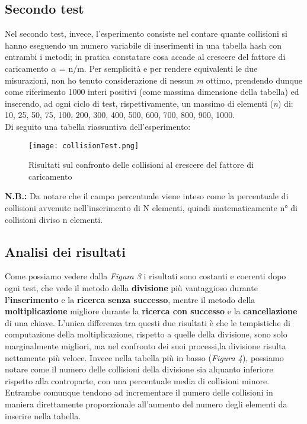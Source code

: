 \documentclass{article}
\begin{document}
\subsection{Secondo test}
Nel secondo test, invece, l'esperimento consiste nel contare quante collisioni si hanno eseguendo un numero variabile di inserimenti in una tabella hash con entrambi i metodi; in pratica constatare cosa accade al crescere del fattore di caricamento $\alpha$ = n/m.
Per semplicità e per rendere equivalenti le due misurazioni, non ho tenuto considerazione di nessun \textit{m} ottimo, prendendo dunque come riferimento 1000 interi positivi (come massima dimensione della tabella) ed inserendo, ad ogni ciclo di test, rispettivamente, un massimo di elementi (\textit{n}) di: 10, 25, 50, 75, 100, 200, 300, 400, 500, 600, 700, 800, 900, 1000.\\
Di seguito una tabella riassuntiva dell'esperimento:
\begin{figure}[!ht]
        \centering
        \texttt{[image: collisionTest.png]}
        \caption{Risultati sul confronto delle collisioni al crescere del fattore di caricamento}
        \label{fig:collisionTest}
\end{figure}

\textbf{N.B.:} Da notare che il campo percentuale viene inteso come la percentuale di collisioni avvenute nell'inserimento di N elementi, quindi matematicamente n° di collisioni diviso n elementi.

\clearpage

\subsection{Analisi dei risultati}
Come possiamo vedere dalla \textit{Figura 3} i risultati sono costanti e coerenti dopo ogni test, che vede il metodo della \textbf{divisione} più vantaggioso durante \textbf{l'inserimento} e la \textbf{ricerca senza successo}, mentre il metodo della \textbf{moltiplicazione} migliore durante la \textbf{ricerca con successo} e la \textbf{cancellazione} di una chiave. L'unica differenza tra questi due risultati è che le tempistiche di computazione della moltiplicazione, rispetto a quelle della divisione, sono solo marginalmente migliori, ma nel confronto dei suoi processi,la divisione risulta nettamente più veloce.
Invece nella tabella più in basso (\textit{Figura 4}), possiamo notare come il numero delle collisioni della divisione sia alquanto inferiore rispetto alla controparte, con una percentuale media di collisioni minore.
Entrambe comunque tendono ad incrementare il numero delle collisioni in maniera direttamente proporzionale all'aumento del numero degli elementi da inserire nella tabella.
\end{document}
